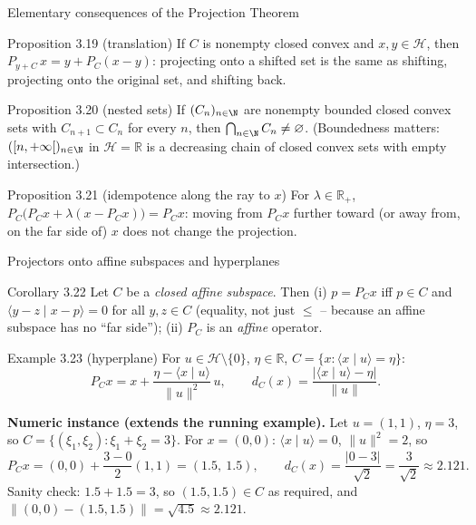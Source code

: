 \documentclass[aspectratio=169,10pt]{beamer}
\newcommand{\Hil}{\mathcal{H}}
\newcommand{\R}{\mathbb{R}}
\newcommand{\Rp}{\mathbb{R}_{+}}
\newcommand{\ip}[2]{\langle #1 \mid #2 \rangle}
\newcommand{\norm}[1]{\lVert #1 \rVert}
\newcommand{\dC}{d_C}
\newcommand{\PC}{P_C}
\begin{document}
\begin{frame}{Elementary consequences of the Projection Theorem}
  \begin{block}{Proposition 3.19 (translation)}
    If $C$ is nonempty closed convex and $x,y\in\Hil$, then
    $P_{y+C}\,x = y + \PC(x-y)$: projecting onto a shifted set is the same
    as shifting, projecting onto the original set, and shifting back.
  \end{block}
  \begin{block}{Proposition 3.20 (nested sets)}
    If $(C_n)_{n\in\N}$ are nonempty bounded closed convex sets with
    $C_{n+1}\subset C_n$ for every $n$, then $\bigcap_{n\in\N}C_n\ne
    \varnothing$. (Boundedness matters: $([n,+\infty[)_{n\in\N}$ in
    $\Hil=\R$ is a decreasing chain of closed convex sets with empty
    intersection.)
  \end{block}
  \begin{block}{Proposition 3.21 (idempotence along the ray to $x$)}
    For $\lambda\in\Rp$, $\PC\big(\PC x + \lambda(x-\PC x)\big) = \PC x$:
    moving from $\PC x$ further toward (or away from, on the far side of)
    $x$ does not change the projection.
  \end{block}
\end{frame}

\begin{frame}{Projectors onto affine subspaces and hyperplanes}
  \begin{block}{Corollary 3.22}
    Let $C$ be a \emph{closed affine subspace}. Then (i) $p=\PC x$ iff
    $p\in C$ and $\ip{y-z}{x-p}=0$ for all $y,z\in C$ (equality, not just
    $\le$ -- because an affine subspace has no ``far side''); (ii) $\PC$ is
    an \emph{affine} operator.
  \end{block}
  \begin{block}{Example 3.23 (hyperplane)}
    For $u\in\Hil\setminus\{0\}$, $\eta\in\R$, $C=\{x:\ip{x}{u}=\eta\}$:
    \[
      \PC x = x + \frac{\eta - \ip{x}{u}}{\norm{u}^2}\,u, \qquad
      \dC(x) = \frac{\lvert\ip{x}{u}-\eta\rvert}{\norm u}.
    \]
  \end{block}
  \textbf{Numeric instance (extends the running example).} Let $u=(1,1)$,
  $\eta=3$, so $C=\{(\xi_1,\xi_2):\xi_1+\xi_2=3\}$. For $x=(0,0)$:
  $\ip{x}{u}=0$, $\norm u^2=2$, so
  \[
    \PC x = (0,0)+\frac{3-0}{2}(1,1) = (1.5,\ 1.5), \qquad
    \dC(x) = \frac{|0-3|}{\sqrt2} = \frac{3}{\sqrt2}\approx 2.121.
  \]
  Sanity check: $1.5+1.5=3$, so $(1.5,1.5)\in C$ as required, and
  $\norm{(0,0)-(1.5,1.5)} = \sqrt{4.5}\approx 2.121$. \checkmark
\end{frame}
\end{document}
